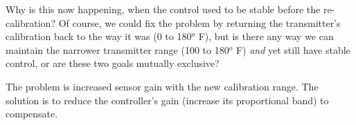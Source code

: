 Why is this now happening, when the control used to be stable before the re-calibration?  Of course, we could fix the problem by returning the transmitter's calibration back to the way it was (0 to 180$^{o}$ F), but is there any way we can maintain the narrower transmitter range (100 to 180$^{o}$ F) {\it and} yet still have stable control, or are these two goals mutually exclusive?







The problem is increased sensor gain with the new calibration range.  The solution is to reduce the controller's gain (increase its proportional band) to compensate.












